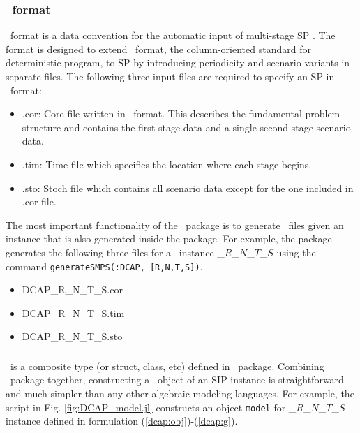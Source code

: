 \subsubsection{\smps\ format} \label{subsec:smps}
\smps\ format is a data convention for the automatic input of multi-stage SP \cite{SMPS}. The format is designed to extend \mps\ format, the column-oriented standard for deterministic program, to SP by introducing periodicity and scenario variants in separate files. The following three input files are required to specify an SP in \smps\ format:
\begin{itemize}
	\item .cor: Core file written in \mps\ format. This describes the fundamental problem structure and contains the first-stage data and a single second-stage scenario data.
	\item .tim: Time file which specifies the location where each stage begins.
	\item .sto: Stoch file which contains all scenario data except for the one included in .cor file.
\end{itemize}
The most important functionality of the \siplibtwo\ package is to generate \smps\ files given an instance that is also generated inside the package. For example, the package generates the following three files for a \dcap\ instance \dcap\_$R$\_$N$\_$T$\_$S$ using the command \texttt{generateSMPS(:DCAP, [R,N,T,S])}.
\begin{itemize}
	\item DCAP\_R\_N\_T\_S.cor
	\item DCAP\_R\_N\_T\_S.tim
	\item DCAP\_R\_N\_T\_S.sto
\end{itemize}

\subsubsection{\jumpmodel}
\jumpmodel\ is a composite type (or struct, class, etc) defined in \jump\ package. Combining \structjump\ package together, constructing a \jumpmodel\ object of an SIP instance is straightforward and much simpler than any other algebraic modeling languages. For example, the script in Fig. \ref{fig:DCAP_model.jl} constructs an object \texttt{model} for \dcap\_$R$\_$N$\_$T$\_$S$ instance defined in formulation (\ref{dcap:obj})-(\ref{dcap:g}). 

